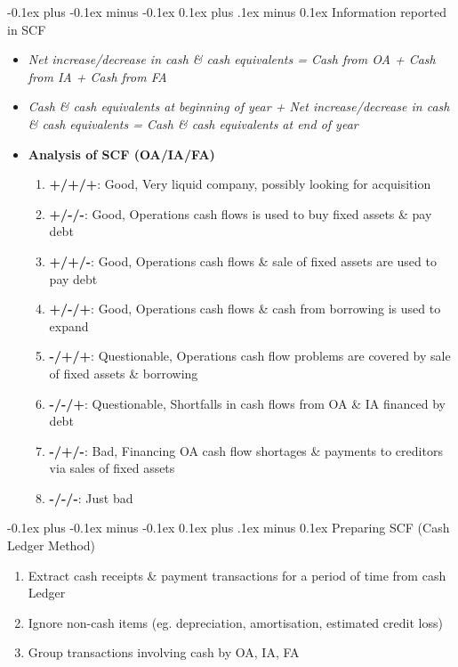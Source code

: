 \documentclass[landscape]{article}
\makeatletter
\renewcommand{\subsection}{\@startsection{subsection}{2}{0mm}%
  {-0.1ex plus -0.1ex minus -0.1ex}%
  {0.1ex plus .1ex minus 0.1ex}%
{\normalfont\scriptsize\bfseries}}
\makeatother
\begin{document}
\begin{multicols}{6}
    \subsection{Information reported in SCF}
    \begin{itemize}
      \item \textit{Net increase/decrease in cash \& cash equivalents = Cash from OA + Cash from IA + Cash from FA}
      \item \textit{Cash \& cash equivalents at beginning of year + Net increase/decrease in cash \& cash equivalents = Cash \& cash equivalents at end of year}
      \item \textbf{Analysis of SCF (OA/IA/FA)}
      \begin{enumerate}
        \item \textbf{+/+/+}: Good, Very liquid company, possibly looking for acquisition
        \item \textbf{+/-/-}: Good, Operations cash flows is used to buy fixed assets \& pay debt
        \item \textbf{+/+/-}: Good, Operations cash flows \& sale of fixed assets are used to pay debt 
        \item \textbf{+/-/+}: Good, Operations cash flows \& cash from borrowing is used to expand
        \item \textbf{-/+/+}: Questionable, Operations cash flow problems are covered by sale of fixed assets \& borrowing
        \item \textbf{-/-/+}: Questionable, Shortfalls in cash flows from OA \& IA financed by debt
        \item \textbf{-/+/-}: Bad, Financing OA cash flow shortages \& payments to creditors via sales of fixed assets
        \item \textbf{-/-/-}: Just bad
      \end{enumerate}
    \end{itemize}

    \subsection{Preparing SCF (Cash Ledger Method)}
    \begin{enumerate}
      \item Extract cash receipts \& payment transactions for a period of time from cash Ledger
      \item Ignore non-cash items (eg. depreciation, amortisation, estimated credit loss)
      \item Group transactions involving cash by OA, IA, FA
    \end{enumerate}


\end{multicols}
\end{document}
